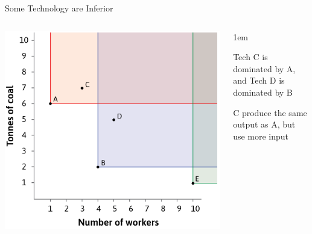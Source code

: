 \documentclass[11pt,aspectratio=43,usenames,dvipsnames]{beamer}
\let\olditemize=\itemize
\let\endolditemize=\enditemize
\renewenvironment{itemize}{\olditemize \itemsep1em}{\endolditemize}
\theoremstyle{definition}
\begin{document}
\begin{frame}{Some Technology are Inferior}
\label{slide:Some_Technology_are_Inferior}
    \begin{columns}
        \begin{column}{0.6\textwidth}
            \includegraphics[width=\textwidth]{./figures/Figure2_4.png}
        \end{column}
        \begin{column}{0.4\textwidth}
            \begin{itemize}
                \item Tech C is dominated by A, and Tech D is dominated by B
                \item C produce the same output as A, but use more input
            \end{itemize}
        \end{column}
    \end{columns}

\end{frame}
\end{document}
